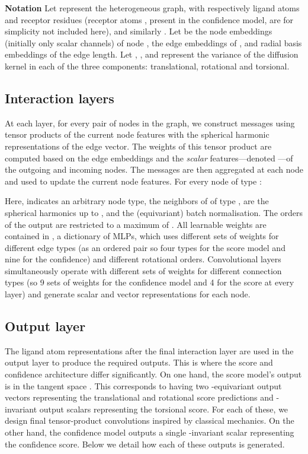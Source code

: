 \documentclass{article} \usepackage{iclr2023_conference,times}
\begin{document}
\textbf{Notation} Let  represent the heterogeneous graph, with  respectively ligand atoms and receptor residues (receptor atoms , present in the confidence model, are for simplicity not included here), and similarly . Let  be the node embeddings (initially only scalar channels) of node ,  the edge embeddings of , and  radial basis embeddings of the edge length. Let , , and  represent the variance of the diffusion kernel in each of the three components: translational, rotational and torsional.


\subsection{Interaction layers}

At each layer, for every pair of nodes in the graph, we construct messages using tensor products of the current node features with the spherical harmonic representations of the edge vector. The weights of this tensor product are computed based on the edge embeddings and the \emph{scalar} features---denoted ---of the outgoing and incoming nodes. The messages are then aggregated at each node and used to update the current node features. For every node  of type :

Here,  indicates an arbitrary node type,  the neighbors of  of type ,  are the spherical harmonics up to , and  the (equivariant) batch normalisation. The orders of the output are restricted to a maximum of . All learnable weights are contained in , a dictionary of MLPs, which uses different sets of weights for different edge types (as an ordered pair so four types for the score model and nine for the confidence) and different rotational orders. Convolutional layers simultaneously operate with different sets of weights for different connection types (so 9 sets of weights for the confidence model and 4 for the score at every layer) and generate scalar and vector representations for each node. 

\subsection{Output layer} 

The ligand atom representations after the final interaction layer are used in the output layer to produce the required outputs. This is where the score and confidence architecture differ significantly. On one hand, the score model's output is in the tangent space . This corresponds to having two -equivariant output vectors representing the translational and rotational score predictions and  -invariant output scalars representing the torsional score. For each of these, we design final tensor-product convolutions inspired by classical mechanics. On the other hand, the confidence model outputs a single -invariant scalar representing the confidence score. Below we detail how each of these outputs is generated.
\end{document}

